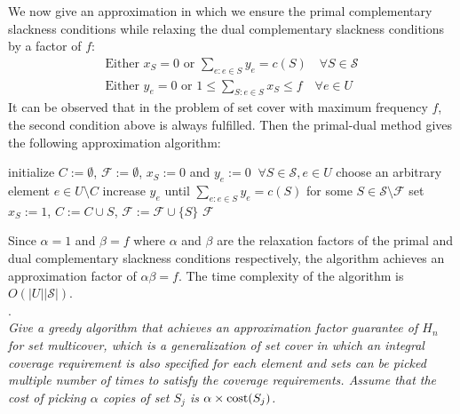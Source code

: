 \documentclass[a4paper,11pt]{article}
\begin{document}
We now give an approximation in which we ensure the primal complementary slackness conditions while relaxing the dual complementary slackness conditions by a factor of $f$:
\begin{gather*}
    \text{Either } x_S = 0 \text{ or } \sum_{e : e \in S} y_e = c(S) \quad \forall S \in \mathcal{S} \\
    \text{Either } y_e = 0 \text{ or } 1 \leq \sum_{S : e \in S} x_S \leq f \quad \forall e \in U
\end{gather*}
It can be observed that in the problem of set cover with maximum frequency $f$, the second condition above is always fulfilled. Then the primal-dual method gives the following approximation algorithm:
\begin{algorithm}[H] {\begin{algorithmic}[1]
        \State initialize $C := \emptyset$, $\mathcal{F} := \emptyset$, $x_S := 0$ and $y_e := 0 \;\; \forall S \in \mathcal{S}, e \in U$
            \State choose an arbitrary element $e \in U \setminus C$
            \State increase $y_e$ until $\sum_{e : e \in S} y_e = c(S)$ for some $S \in \mathcal{S} \setminus \mathcal{F}$
                \State set $x_S := 1$, $C := C \cup S$, $\mathcal{F} := \mathcal{F} \cup \{ S \}$
            \EndFor
        \EndWhile
        \State \Return $\mathcal{F}$ %
\end{algorithmic}} \end{algorithm}
Since $\alpha = 1$ and $\beta = f$ where $\alpha$ and $\beta$ are the relaxation factors of the primal and dual complementary slackness conditions respectively, the algorithm achieves an approximation factor of $\alpha \beta = f$. The time complexity of the algorithm is $O(|U||\mathcal{S}|)$. \\


.  \\
\emph{Give a greedy algorithm that achieves an approximation factor guarantee of $H_n$ 
for set multicover, which is a generalization of set cover in which an integral coverage requirement
is also specified for each element and sets can be picked multiple number of times
to satisfy the coverage requirements. 
Assume that the cost of picking $\alpha$ copies of set $S_j$ is $\alpha \times {\rm cost}(S_j)$.} \par
\end{document}
